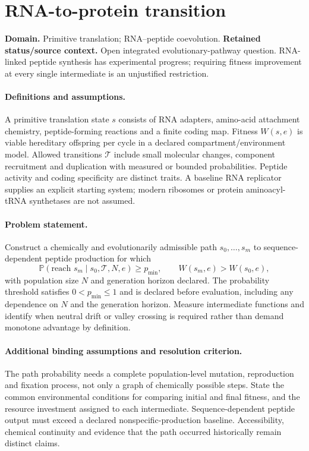 \documentclass[11pt]{article}
\begin{document}
\section*{RNA-to-protein transition}
\label{prob:295}
\label{rank:2}
\par\smallskip

\noindent\textbf{Domain.} Primitive translation; RNA--peptide coevolution. \quad \textbf{Retained status/source context.} Open integrated evolutionary-pathway question. RNA-linked peptide synthesis has experimental progress; requiring fitness improvement at every single intermediate is an unjustified restriction.

\paragraph{Definitions and assumptions.} A primitive translation state $s$ consists of RNA adapters, amino-acid attachment chemistry, peptide-forming reactions and a finite coding map. Fitness $W(s,e)$ is viable hereditary offspring per cycle in a declared compartment/environment model. Allowed transitions $\mathcal T$ include small molecular changes, component recruitment and duplication with measured or bounded probabilities. Peptide activity and coding specificity are distinct traits. A baseline RNA replicator supplies an explicit starting system; modern ribosomes or protein aminoacyl-tRNA synthetases are not assumed.

\paragraph{Problem statement.} Construct a chemically and evolutionarily admissible path $s_0,\ldots,s_m$ to sequence-dependent peptide production for which
\[
\mathbb{P}(\text{reach }s_m\mid s_0,\mathcal T,N,e)\geq p_{\min},
\qquad W(s_m,e)>W(s_0,e),
\]
with population size $N$ and generation horizon declared. The probability threshold satisfies $0<p_{\min}\leq1$ and is declared before evaluation, including any dependence on $N$ and the generation horizon. Measure intermediate functions and identify when neutral drift or valley crossing is required rather than demand monotone advantage by definition.

\paragraph{Additional binding assumptions and resolution criterion.} The path probability needs a complete population-level mutation, reproduction and fixation process, not only a graph of chemically possible steps. State the common environmental conditions for comparing initial and final fitness, and the resource investment assigned to each intermediate. Sequence-dependent peptide output must exceed a declared nonspecific-production baseline. Accessibility, chemical continuity and evidence that the path occurred historically remain distinct claims.
\end{document}
